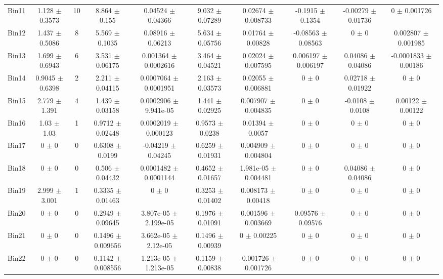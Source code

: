 \begin{tabular}{@{\extracolsep{4pt}}lccccccccc@{}}
     Bin11 & 1.128 $\pm$ 0.3573 & 10 & 8.864 $\pm$ 0.155 & 0.04524 $\pm$ 0.04366 & 9.032 $\pm$ 0.07289 & 0.02674 $\pm$ 0.008733 & -0.1915 $\pm$ 0.1354 & -0.00279 $\pm$ 0.01736 & 0 $\pm$ 0.001726 \\ 
     Bin12 & 1.437 $\pm$ 0.5086 & 8 & 5.569 $\pm$ 0.1035 & 0.08916 $\pm$ 0.06213 & 5.634 $\pm$ 0.05756 & 0.01764 $\pm$ 0.00828 & -0.08563 $\pm$ 0.08563 & 0 $\pm$ 0 & 0.002807 $\pm$ 0.001985 \\ 
     Bin13 & 1.699 $\pm$ 0.6943 & 6 & 3.531 $\pm$ 0.06175 & 0.001364 $\pm$ 0.0002616 & 3.464 $\pm$ 0.04521 & 0.02024 $\pm$ 0.007595 & 0.006197 $\pm$ 0.006197 & 0.04086 $\pm$ 0.04086 & -0.0001833 $\pm$ 0.00186 \\ 
     Bin14 & 0.9045 $\pm$ 0.6398 & 2 & 2.211 $\pm$ 0.04115 & 0.0007064 $\pm$ 0.0001951 & 2.163 $\pm$ 0.03573 & 0.02055 $\pm$ 0.006881 & 0 $\pm$ 0 & 0.02718 $\pm$ 0.01922 & 0 $\pm$ 0 \\ 
     Bin15 & 2.779 $\pm$ 1.391 & 4 & 1.439 $\pm$ 0.03158 & 0.0002906 $\pm$ 9.941e-05 & 1.441 $\pm$ 0.02925 & 0.007907 $\pm$ 0.004835 & 0 $\pm$ 0 & -0.0108 $\pm$ 0.0108 & 0.00122 $\pm$ 0.00122 \\ 
     Bin16 & 1.03 $\pm$ 1.03 & 1 & 0.9712 $\pm$ 0.02448 & 0.0002019 $\pm$ 0.000123 & 0.9573 $\pm$ 0.0238 & 0.01394 $\pm$ 0.0057 & 0 $\pm$ 0 & 0 $\pm$ 0 & 0 $\pm$ 0 \\ 
     Bin17 & 0 $\pm$ 0 & 0 & 0.6308 $\pm$ 0.0199 & -0.04219 $\pm$ 0.04245 & 0.6259 $\pm$ 0.01931 & 0.004909 $\pm$ 0.004804 & 0 $\pm$ 0 & 0 $\pm$ 0 & 0 $\pm$ 0 \\ 
     Bin18 & 0 $\pm$ 0 & 0 & 0.506 $\pm$ 0.04432 & 0.0001482 $\pm$ 0.0001144 & 0.4652 $\pm$ 0.01657 & 1.981e-05 $\pm$ 0.004481 & 0 $\pm$ 0 & 0.04086 $\pm$ 0.04086 & 0 $\pm$ 0 \\ 
     Bin19 & 2.999 $\pm$ 3.001 & 1 & 0.3335 $\pm$ 0.01463 & 0 $\pm$ 0 & 0.3253 $\pm$ 0.01402 & 0.008173 $\pm$ 0.00418 & 0 $\pm$ 0 & 0 $\pm$ 0 & 0 $\pm$ 0 \\ 
     Bin20 & 0 $\pm$ 0 & 0 & 0.2949 $\pm$ 0.09645 & 3.807e-05 $\pm$ 2.199e-05 & 0.1976 $\pm$ 0.01091 & 0.001596 $\pm$ 0.003669 & 0.09576 $\pm$ 0.09576 & 0 $\pm$ 0 & 0 $\pm$ 0 \\ 
     Bin21 & 0 $\pm$ 0 & 0 & 0.1496 $\pm$ 0.009656 & 3.662e-05 $\pm$ 2.12e-05 & 0.1496 $\pm$ 0.00939 & 0 $\pm$ 0.00225 & 0 $\pm$ 0 & 0 $\pm$ 0 & 0 $\pm$ 0 \\ 
     Bin22 & 0 $\pm$ 0 & 0 & 0.1142 $\pm$ 0.008556 & 1.213e-05 $\pm$ 1.213e-05 & 0.1159 $\pm$ 0.00838 & -0.001726 $\pm$ 0.001726 & 0 $\pm$ 0 & 0 $\pm$ 0 & 0 $\pm$ 0 \\ 

\end{tabular}

